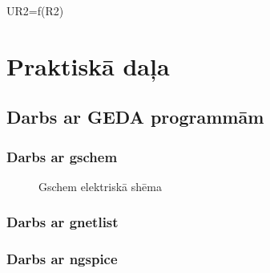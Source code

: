 \documentclass{report}
\begin{document}
\pgfplotsset{width=10cm,compat=1.9}
UR2=f(R2)




\chapter{Praktiskā daļa}
\section{Darbs ar GEDA programmām}
\subsection{Darbs ar gschem}




\begin{figure}[!b]
\centering
{}
\caption{Gschem elektriskā shēma}
\label{1}
\end{figure}

\subsection{Darbs ar gnetlist}

\subsection{Darbs ar ngspice}
\end{document}
